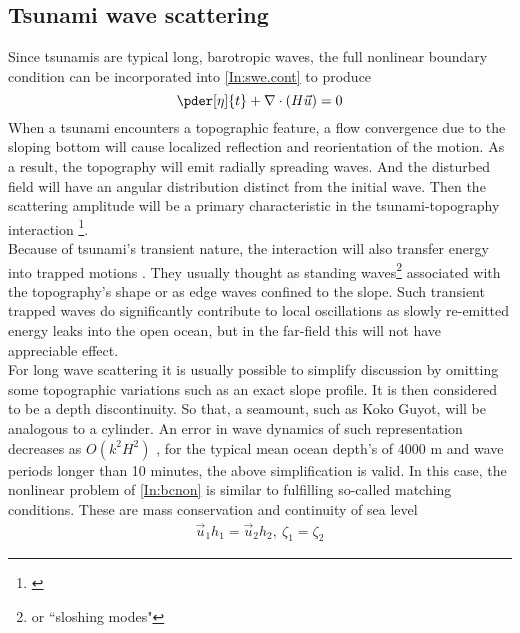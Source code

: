 \documentclass[12pt]{article}
\begin{document}
\subsection{Tsunami wave scattering}
Since tsunamis are typical long, barotropic waves, the full nonlinear boundary condition can be 
incorporated into \eqref{In:swe.cont} to produce
\begin{equation}
\pder[\eta]{t} + \nabla  \cdot (H \vec{u}) = 0 
\end{equation}
When a tsunami encounters a topographic feature, a flow convergence due to the sloping bottom will 
cause localized reflection and reorientation of the motion. As a result, the topography will emit 
radially spreading waves. And the disturbed field will have an angular distribution distinct from 
the initial wave. Then the scattering amplitude will be a primary characteristic in the 
tsunami-topography interaction \footnote{\citep{vastano1973transient, saito2009scattering}}.\\
Because of tsunami's transient nature, the interaction will also transfer energy into trapped 
motions \citep{longuet1967trapping, tinti1995tsunami}. They usually thought as standing 
waves\footnote{ or ``sloshing modes"} associated with the topography's shape or as edge waves 
confined to the slope. Such transient trapped waves do significantly contribute to local 
oscillations as slowly re-emitted energy leaks into the open ocean, but in the far-field this will 
not have appreciable effect.\\
For long wave scattering it is usually possible to simplify discussion by omitting some topographic 
variations such as an exact slope profile. It is then considered to be a depth discontinuity. So 
that, a seamount, such as Koko Guyot, will be analogous to a cylinder. An error in wave dynamics of 
such representation decreases as $O(k^2 H^2)$ \citep{mei1989theory}, for the typical mean ocean 
depth's of 4000 m and wave periods longer than 10 minutes, the above simplification is valid. In 
this case, the nonlinear problem of \eqref{In:bcnon} is similar to fulfilling so-called matching 
conditions. These are mass conservation and continuity of sea level
\begin{align}
\vec{u}_1 h_1 = \vec{u}_2 h_2,~\zeta_1 = \zeta_2
\end{align}
\end{document}
